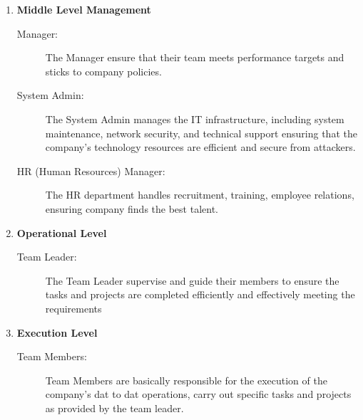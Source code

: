\begin{enumerate}
            \item \textbf{Middle Level Management}
            \begin{itemize}
            \begin{description}
                \item[Manager: ] The Manager ensure that their team meets performance targets and sticks to company policies. 
                \item[System Admin: ] The System Admin manages the IT infrastructure, including system maintenance, network security, and technical support ensuring that the company’s technology resources are efficient and secure from attackers.
                \item[HR (Human Resources) Manager:] The HR department handles recruitment, training, employee relations, ensuring company finds the best talent.
            \end{description}
            \end{itemize}
            \item \textbf{Operational Level}
            \begin{itemize}
            \begin{description}
                \item[Team Leader: ] The Team Leader supervise and guide their members to ensure the tasks and projects are completed efficiently and effectively meeting the requirements 
            \end{description}
            \end{itemize}
            \item \textbf{Execution Level}
            \begin{itemize}

            \begin{description}
                \item[Team Members:] Team Members are basically responsible for the execution of the company's dat to dat operations, carry out specific tasks and projects as provided by the team leader.
            \end{description}
            \end{itemize}
        \end{enumerate}
